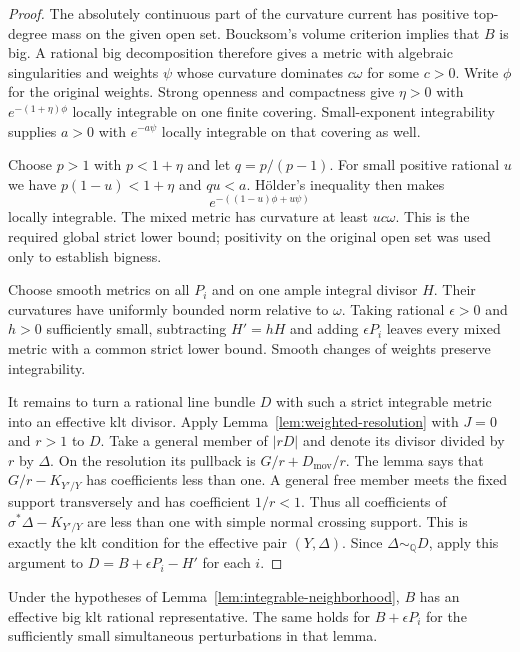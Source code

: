 \begin{proof}
The absolutely continuous part of the curvature current has positive
top-degree mass on the given open set.  Boucksom's volume criterion
\cite[Theorem 1.2(i)]{Boucksom2002} implies that $B$ is big.
A rational big decomposition therefore gives a metric with algebraic
singularities and weights $\psi$ whose curvature dominates $c\omega$
for some $c>0$.  Write $\phi$ for the original weights.
Strong openness and compactness give $\eta>0$ with
$e^{-(1+\eta)\phi}$ locally integrable on one finite covering.
Small-exponent integrability supplies $a>0$ with $e^{-a\psi}$
locally integrable on that covering as well.

Choose $p>1$ with $p<1+\eta$ and let $q=p/(p-1)$.
For small positive rational $u$ we have $p(1-u)<1+\eta$ and $qu<a$.
H\"older's inequality then makes
\[
 e^{-((1-u)\phi+u\psi)}
\]
locally integrable.  The mixed metric has curvature at least $uc\omega$.
This is the required global strict lower bound; positivity on the
original open set was used only to establish bigness.

Choose smooth metrics on all $P_i$ and on one ample integral divisor
$H$.  Their curvatures have uniformly bounded norm relative to $\omega$.
Taking rational $\epsilon>0$ and $h>0$ sufficiently small, subtracting
$H'=hH$ and adding $\epsilon P_i$ leaves every mixed metric with a
common strict lower bound.  Smooth changes of weights preserve
integrability.

It remains to turn a rational line bundle $D$ with such a strict
integrable metric into an effective klt divisor.  Apply
Lemma~\ref{lem:weighted-resolution} with $J=0$ and $r>1$ to $D$.
Take a general member of $|rD|$ and denote its divisor divided by $r$
by $\Delta$.  On the resolution its pullback is
$G/r+D_{\mathrm{mov}}/r$.  The lemma says that
$G/r-K_{Y'/Y}$ has coefficients less than one.
A general free member meets the fixed support transversely and has
coefficient $1/r<1$.  Thus all coefficients of
$\sigma^*\Delta-K_{Y'/Y}$ are less than one with simple normal
crossing support.  This is exactly the klt condition for the effective
pair $(Y,\Delta)$.  Since $\Delta\sim_{\mathbb Q}D$, apply this
argument to $D=B+\epsilon P_i-H'$ for each $i$.
\end{proof}

\begin{corollary}\label{cor:big-klt-representative}
Under the hypotheses of Lemma~\ref{lem:integrable-neighborhood}, $B$
has an effective big klt rational representative.  The same holds for
$B+\epsilon P_i$ for the sufficiently small simultaneous perturbations
in that lemma.
\end{corollary}


